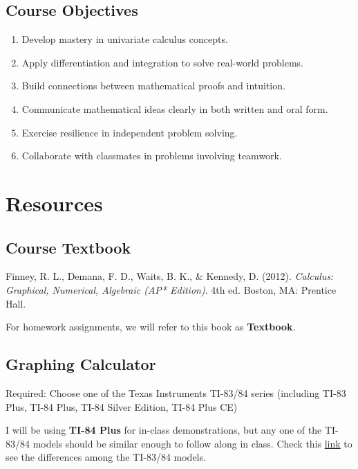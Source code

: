 \documentclass[12pt,fleqn]{article}
\providecommand{\tightlist}{%
  \setlength{\itemsep}{0pt}\setlength{\parskip}{0pt}}
\begin{document}
\hypertarget{course-objectives}{%
\subsection{Course Objectives}\label{course-objectives}}

\begin{enumerate}
\def\labelenumi{\arabic{enumi}.}
\tightlist
\item
  Develop mastery in univariate calculus concepts.
\item
  Apply differentiation and integration to solve real-world problems.
\item
  Build connections between mathematical proofs and intuition.
\item
  Communicate mathematical ideas clearly in both written and oral form.
\item
  Exercise resilience in independent problem solving.
\item
  Collaborate with classmates in problems involving teamwork.
\end{enumerate}

\hypertarget{resources}{%
\section{Resources}\label{resources}}

\hypertarget{course-textbook}{%
\subsection{Course Textbook}\label{course-textbook}}

Finney, R. L., Demana, F. D., Waits, B. K., \& Kennedy, D. (2012).
\emph{Calculus: Graphical, Numerical, Algebraic (AP* Edition)}. 4th ed.
Boston, MA: Prentice Hall.

For homework assignments, we will refer to this book as \textbf{Textbook}.

\hypertarget{graphing-calculator}{%
\subsection{Graphing Calculator}\label{graphing-calculator}}

Required: Choose one of the Texas Instruments TI-83/84 series (including TI-83 Plus, TI-84 Plus, TI-84 Silver Edition, TI-84 Plus CE)

I will be using \textbf{TI-84 Plus} for in-class demonstrations, but any one of the TI-83/84 models should be similar enough to follow along in class. Check this \href{https://brownmath.com/ti83/diff8384.htm\#PlusSilver}{link} to see the differences among the TI-83/84 models.
\end{document}
